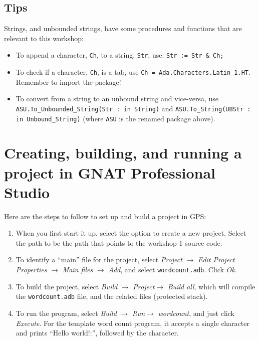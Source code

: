 \documentclass{article}
\begin{document}
\subsection*{Tips}

Strings, and unbounded strings, have some procedures and functions that are relevant to this workshop:

\begin{itemize}

 \item To append a character, \texttt{Ch}, to a string, \texttt{Str}, use: \texttt{Str := Str \& Ch;}

 \item To check if a character, \texttt{Ch}, is a tab, use \texttt{Ch = Ada.Characters.Latin\_1.HT}. Remember to import the package!

 \item To convert from a string to an unbound string and vice-versa, use \texttt{ASU.To\_Unbounded\_String(Str : in String)} and \texttt{ASU.To\_String(UBStr : in Unbound\_String)} (where \texttt{ASU} is the renamed package above).


\end{itemize}

\appendix

\section{Creating, building, and running a project in GNAT Professional Studio}

Here are the steps to follow to set up and build a project in GPS:

\begin{enumerate}

\item When you first start it up, select the option to create a new project. Select the path to be the path that points to the workshop-1 source code.

\item To identify a ``main'' file for the project, select \emph{Project} $\rightarrow$ \emph{Edit Project Properties} $\rightarrow$ \emph{Main files} $\rightarrow$ \emph{Add}, and select \texttt{wordcount.adb}. Click \emph{Ok}.

\item To build the project, select \emph{Build} $\rightarrow$ \emph{Project}$\rightarrow$ \emph{Build all}, which will compile the \texttt{wordcount.adb} file, and the related files (protected stack).

\item To run the program, select  \emph{Build} $\rightarrow$ \emph{Run}$\rightarrow$ \emph{wordcount}, and just click \emph{Execute}. For the template word count program, it accepts a single character and prints ``Hello world!:'', followed by the character.

\end{enumerate}
\end{document}
